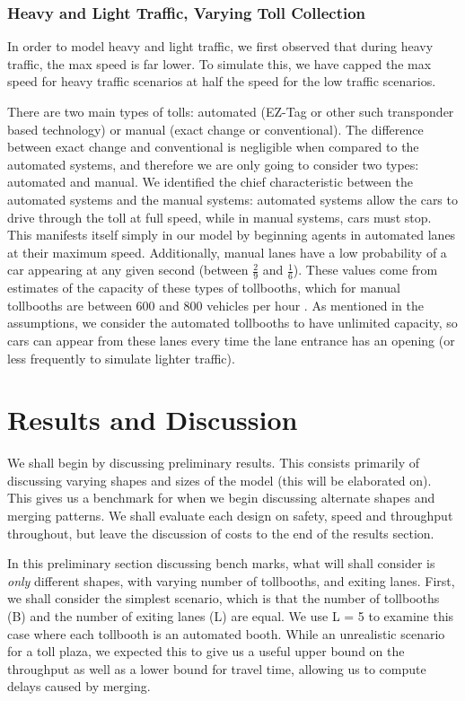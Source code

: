 \documentclass[a4paper, 11pt]{article}
\begin{document}
\subsubsection{Heavy and Light Traffic, Varying Toll Collection}

In order to model heavy and light traffic, we first observed that during heavy traffic, the max speed is far lower. To simulate this, we have capped the max speed for heavy traffic scenarios at half the speed for the low traffic scenarios. 

There are two main types of tolls:
automated (EZ-Tag or other such transponder based technology) or manual (exact change or conventional). The difference between exact change and conventional is negligible when compared to the automated systems, and therefore we are only going to consider two types: automated and manual. We identified the chief characteristic between the automated systems and the manual systems: automated systems allow the cars to drive through the toll at full speed, while in manual systems, cars must stop. This manifests itself simply in our model by beginning agents in automated lanes at their maximum speed.
Additionally, manual lanes have a low probability of a car appearing at any given second (between $\frac29$ and $\frac16$). These values come from estimates of the capacity of these types of tollbooths, which for manual tollbooths are between 600 and 800 vehicles per hour \cite{EconomicEvaluation}. As mentioned in the assumptions, we consider the automated tollbooths to have unlimited capacity, so cars can appear from these lanes every time the lane entrance has an opening (or less frequently to simulate lighter traffic). 


\section{Results and Discussion}
\label{results}


We shall begin by discussing preliminary results. This consists primarily of discussing varying shapes and sizes of the model (this will be elaborated on). This gives us a benchmark for when we begin discussing alternate shapes and merging patterns. We shall evaluate each design on safety, speed and throughput throughout, but leave the discussion of costs to the end of the results section.

In this preliminary section discussing bench marks, what will shall consider is \textit{only} different shapes, with varying number of tollbooths, and exiting lanes. First, we shall consider the simplest scenario, which is that the number of tollbooths (B) and the number of exiting lanes (L) are equal. We use L = 5 to examine this case where each tollbooth is an automated booth. While an unrealistic scenario for a toll plaza, we expected this to give us a useful upper bound on the throughput as well as a lower bound for travel time, allowing us to compute delays caused by merging.
\end{document}
